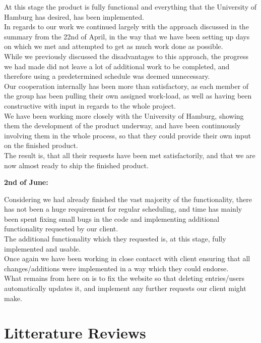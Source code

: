 \documentclass[12pt,a4paper]{article}
\begin{document}
At this stage the product is fully functional and everything that the University of Hamburg has desired, has been implemented.\\
In regards to our work we continued largely with the approach discussed in the summary from the 22nd of April, in the way that we have been setting up days on which we met and attempted to get as much work done as possible.\\
While we previously discussed the disadvantages to this approach, the progress we had made did not leave a lot of additional work to be completed, and therefore using a predetermined schedule was deemed unnecessary.\\
Our cooperation internally has been more than satisfactory, as each member of the group has been pulling their own assigned work-load, as well as having been constructive with input in regards to the whole project.\\
We have been working more closely with the University of Hamburg, showing them the development of the product underway, and have been continuously involving them in the whole process, so that they could provide their own input on the finished product.\\
The result is, that all their requests have been met satisfactorily, and that we are now almost ready to ship the finished product.

{\bf 2nd of June:}

Considering we had already finished the vast majority of the functionality, there has not been a huge requirement for regular scheduling, and time has mainly been spent fixing small bugs in the code and implementing additional functionality requested by our client.\\
The additional functionality which they requested is, at this stage, fully implemented and usable.\\
Once again we have been working in close contacct with client ensuring that all changes/additions were implemented in a way which they could endorse.\\
What remains from here on is to fix the website so that deleting entries/users automatically updates it, and implement any further requests our client might make.

\newpage
\section{Litterature Reviews}
\end{document}
